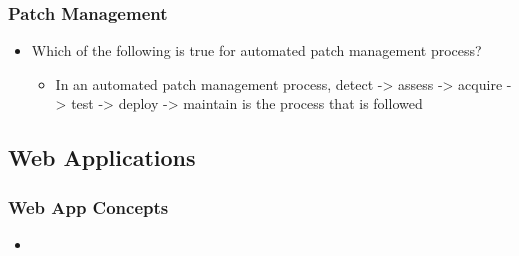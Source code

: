 \subsubsection{Patch Management}
\begin{itemize}
    \item Which of the following is true for automated patch management process?
    \begin{itemize}
        \item In an automated patch management process, detect -> assess -> acquire -> test -> deploy -> maintain is the process that is followed
    \end{itemize}
\end{itemize}

\subsection{Web Applications}
\subsubsection{Web App Concepts}
\begin{itemize}
    \item 
\end{itemize}
